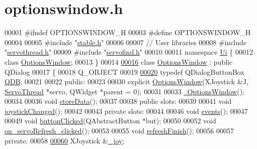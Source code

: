 \hypertarget{a00020_source}{}\section{optionswindow.\+h}

\begin{DoxyCode}
00001 \textcolor{preprocessor}{#ifndef OPTIONSWINDOW\_H}
00003 \textcolor{preprocessor}{#define OPTIONSWINDOW\_H}
00004 
00005 \textcolor{preprocessor}{#include "\hyperlink{a00025}{stable.h}"}
00006 
00007 \textcolor{comment}{// User libraries}
00008 \textcolor{preprocessor}{#include "\hyperlink{a00024}{servothread.h}"}
00009 \textcolor{preprocessor}{#include "\hyperlink{a00022}{servofind.h}"}
00010 
00011 \textcolor{keyword}{namespace }\hyperlink{a00027}{Ui} \{
00012 \textcolor{keyword}{class }\hyperlink{a00006}{OptionsWindow};
00013 \}
00014 
\hypertarget{a00020_source_l00016}{}\hyperlink{a00006}{00016} \textcolor{keyword}{class }\hyperlink{a00006}{OptionsWindow} : \textcolor{keyword}{public} QDialog
00017 \{
00018     Q\_OBJECT
00019     
\hypertarget{a00020_source_l00020}{}\hyperlink{a00006_aadac35a91eb1992c12e4ba6c4d5ad1be}{00020}     \textcolor{keyword}{typedef} QDialogButtonBox \hyperlink{a00006_aadac35a91eb1992c12e4ba6c4d5ad1be}{QDB};
00021     
00022 \textcolor{keyword}{public}:
00023     
00030     \textcolor{keyword}{explicit} \hyperlink{a00006_ae8e0a610d13a0478bdac57ec7cd4afba}{OptionsWindow}(XJoystick &J, \hyperlink{a00009}{ServoThread} *servo, QWidget *parent = 0);
00031     
00033     \hyperlink{a00006_a034c885fe8bb4416e732a9571d14a6b4}{~OptionsWindow}();
00034     
00036     \textcolor{keywordtype}{void} \hyperlink{a00006_ab0a56ad7347c20046602a7a2a1c83397}{storeData}();
00037     
00038 \textcolor{keyword}{public} slots:
00039     
00041     \textcolor{keywordtype}{void} \hyperlink{a00006_ae8c0373be58da710194f8d14f1c3c4dc}{joystickChanged}();
00042 
00043 \textcolor{keyword}{private} slots:
00044     
00046     \textcolor{keywordtype}{void} \hyperlink{a00006_a18763ff318688083c7ee5a21f22e8e98}{events}();
00047     
00049     \textcolor{keywordtype}{void} \hyperlink{a00006_a1f7d6790701ff9b1301533b8ad045ede}{buttonClicked}(QAbstractButton *but);
00050     
00052     \textcolor{keywordtype}{void} \hyperlink{a00006_ad5365d452e8bcd86cbb64b9ec42c3b7e}{on\_servoRefresh\_clicked}();
00053     
00055     \textcolor{keywordtype}{void} \hyperlink{a00006_ae52f8ca70b1bfa4c8d21d25e49e309d7}{refreshFinish}();
00056     
00057 \textcolor{keyword}{private}:
00058     
\hypertarget{a00020_source_l00060}{}\hyperlink{a00006_a1bf846ab681ab245f70adac30999947c}{00060}     XJoystick &\hyperlink{a00006_a1bf846ab681ab245f70adac30999947c}{\_joy};

\end{DoxyCode}
